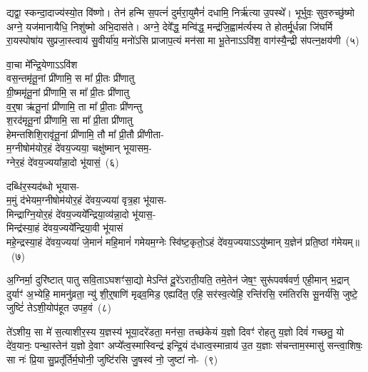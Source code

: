 द्यद्वा॒ स्कन्दा॒दाज्य॑स्यो॒त वि॑ष्णो। तेन॑ हन्मि स॒पत्नं॑ दुर्मरा॒युमैनं॑ दधामि॒ निर्\mbox{}ऋ॑त्या उ॒पस्थे᳚। भूर्भुवः॒ सुव॒रुच्छु॑ष्मो अग्ने॒ यज॑मानायैधि॒ निशु॑ष्मो अभि॒दास॑ते। अग्ने॒ देवे᳚द्ध॒ मन्वि॑द्ध॒ मन्द्र॑जि॒ह्वाम॑र्त्यस्य ते होतर्मू॒र्धन्ना जि॑घर्मि रा॒यस्पोषा॑य सुप्रजा॒स्त्वाय॑ सु॒वीर्या॑य॒ मनो॑\-ऽसि प्राजाप॒त्यं मन॑सा मा भू॒तेना\-ऽऽ\-वि॑श॒ वाग॑स्यै॒न्द्री स॑पत्न॒क्षय॑णी~(५)\ip

वा॒चा मे᳚न्द्रि॒येणा\-ऽऽ\-वि॑श\\
वस॒न्तमृ॑तू॒नां प्री॑णामि॒ स मा᳚ प्री॒तः प्री॑णातु\\
ग्री॒ष्ममृ॑तू॒नां प्री॑णामि॒ स मा᳚ प्री॒तः प्री॑णातु\\
व॒र्॒\mbox{}षा ऋ॑तू॒नां प्री॑णामि॒ ता मा᳚ प्री॒ताः प्री॑णन्तु\\
श॒रद॑मृतू॒नां प्री॑णामि॒ सा मा᳚ प्री॒ता प्री॑णातु\\
हेमन्तशिशि॒रावृ॑तू॒नां प्री॑णामि॒ तौ मा᳚ प्री॒तौ प्री॑णीता-\\
म॒ग्नी\-षोम॑योर॒हं दे॑वय॒ज्यया॒ चक्षु॑ष्मान् भूयासम॒-\\
ग्नेर॒हं दे॑वय॒ज्यया᳚न्ना॒दो भू॑यासं॒~(६)\ip

दब्धि॑र॒स्यद॑ब्धो भूयास-\\
म॒मुं द॑भेयम॒ग्नी\-षोम॑योर॒हं दे॑वय॒ज्यया॑ वृत्र॒हा भू॑यास-\\
मिन्द्राग्नि॒योर॒हं दे॑वय॒ज्यये᳚न्द्रिया॒\-व्य॑न्ना॒दो भू॑यास॒-\\
मिन्द्र॑स्या॒हं दे॑वय॒ज्यये᳚न्द्रिया॒वी भू॑यासं\\
महे॒न्द्रस्या॒हं दे॑वय॒ज्यया॑ जे॒मानं॑ महि॒मानं॑ गमेयम॒ग्नेः स्वि॑ष्ट॒कृतो॒\-ऽहं दे॑वय॒ज्यया\-ऽऽ\-यु॑ष्मान् य॒ज्ञेन॑ प्रति॒ष्ठां ग॑मेयम्॥~(७)\ip

{\anuvakamend[{रिष्या᳚थ्सपत्न॒क्षय॑ण्यन्ना॒दो भू॑यास॒ꣳ॒ षट्त्रिꣳ॑शच्च}]}

अ॒ग्निर्मा॒ दुरि॑ष्टात् पातु सवि॒ता\-ऽघशꣳ॑सा॒द्यो मे\-ऽन्ति॑ दू॒रे॑\-ऽराती॒यति॒ तमे॒तेन॑ जेष॒ꣳ॒ सुरू॑पवर्\mbox{}षवर्ण॒ एही॒मान् भ॒द्रान् दुर्याꣳ॑ अ॒भ्येहि॒ मामनु॑व्रता॒ न्यु॑ शी॒र्॒\mbox{}षाणि॑ मृढ्व॒मिड॒ एह्यदि॑त॒ एहि॒ सर॑स्व॒त्येहि॒ रन्ति॑रसि॒ रम॑तिरसि सू॒नर्य॑सि॒ जुष्टे॒ जुष्टिं॑ ते\-ऽशी॒योप॑हूत उपह॒वं~(८)\ip

ते॑\-ऽशीय॒ सा मे॑ स॒त्याशीर॒स्य य॒ज्ञस्य॑ भूया॒दरे॑डता॒ मन॑सा॒ तच्छ॑केयं य॒ज्ञो दिवꣳ॑ रोहतु य॒ज्ञो दिवं॑ गच्छतु॒ यो दे॑व॒यानः॒ पन्था॒स्तेन॑ य॒ज्ञो दे॒वाꣳ अप्ये᳚त्व॒स्मास्विन्द्र॑ इन्द्रि॒यं द॑धात्व॒स्मान्राय॑ उ॒त य॒ज्ञाः स॑चन्ताम॒स्मासु॑ सन्त्वा॒शिषः॒ सा नः॑ प्रि॒या सु॒प्रतू᳚र्तिर्म॒घोनी॒ जुष्टि॑रसि जु॒षस्व॑ नो॒ जुष्टा॑ नो-~(९)\ip


